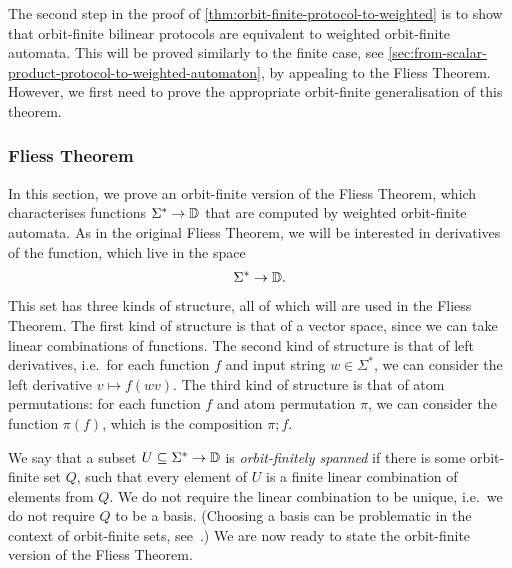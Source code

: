 \begin{theorem}
The second step in the proof of \cref{thm:orbit-finite-protocol-to-weighted} is to show that orbit-finite bilinear protocols are equivalent to weighted orbit-finite automata.  This will be proved similarly to the finite case, see \cref{sec:from-scalar-product-protocol-to-weighted-automaton}, by appealing to the Fliess Theorem. However, we first  need to prove the appropriate  orbit-finite generalisation  of this theorem.

\subsubsection{Fliess Theorem}
In this section, we prove an orbit-finite version of the Fliess Theorem, which characterises functions $\Sigma^* \to \mathbb D$ that are computed by weighted orbit-finite automata. As in the original Fliess Theorem, we will be interested in derivatives of the function, which live in the space  
\begin{align*}
\Sigma^* \to \mathbb D.
\end{align*}
This set has three kinds of structure, all of which will are used in the Fliess Theorem. The first kind of structure is that of a vector space, since we can take linear combinations of functions. The second kind of structure is that of left derivatives, i.e.~for each function $f$ and input string $w \in \Sigma^*$, we can consider the left derivative $v \mapsto f(wv)$. The third kind of structure is that of atom permutations: for each function $f$ and atom permutation $\pi$, we can consider the function $\pi(f)$, which is the composition $\pi;f$.

We say that a subset  $U \subseteq \Sigma^* \to \mathbb D$  is \emph{orbit-finitely spanned} if there is some orbit-finite set $Q$, such that  every element of $U$ is a finite linear combination of elements from $Q$. We do not require the linear combination to be unique, i.e.~we do not require $Q$ to be a basis. (Choosing a basis can be problematic in the context of orbit-finite sets, see~\cite[Example 77]{bojanczyk_slightly}.) We are now ready to state the orbit-finite version of the Fliess Theorem.


\end{theorem}
